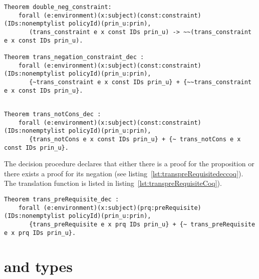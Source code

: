 \begin{lstlisting}
Theorem double_neg_constraint:
    forall (e:environment)(x:subject)(const:constraint)(IDs:nonemptylist policyId)(prin_u:prin),
       (trans_constraint e x const IDs prin_u) -> ~~(trans_constraint e x const IDs prin_u).
  
Theorem trans_negation_constraint_dec :
    forall (e:environment)(x:subject)(const:constraint)(IDs:nonemptylist policyId)(prin_u:prin),
       {~trans_constraint e x const IDs prin_u} + {~~trans_constraint e x const IDs prin_u}.
       
\end{lstlisting}

\begin{lstlisting}
Theorem trans_notCons_dec :
    forall (e:environment)(x:subject)(const:constraint)(IDs:nonemptylist policyId)(prin_u:prin),
       {trans_notCons e x const IDs prin_u} + {~ trans_notCons e x const IDs prin_u}.

\end{lstlisting}

The decision procedure  declares that either there is a proof for the proposition  or there exists a proof for its negation (see listing~\ref{lst:transpreRequisitedeccoq}). The translation function  is listed in listing~\ref{lst:transpreRequisiteCoq}). 


\begin{lstlisting}
Theorem trans_preRequisite_dec :
    forall (e:environment)(x:subject)(prq:preRequisite)(IDs:nonemptylist policyId)(prin_u:prin),
       {trans_preRequisite e x prq IDs prin_u} + {~ trans_preRequisite e x prq IDs prin_u}.
\end{lstlisting}


\section{ and  types}\label{sec:answerandresulttypes}

